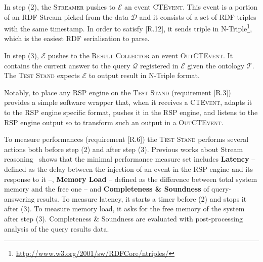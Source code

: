                                                                                                                                                                                                                                                                                                                                                                                                                                                                                                                                                                                                                                                                                                                                                                                                                                                                                                                                                                                                                                                                                                                                                                                                                                              

In step (2), the \textsc{Streamer} pushes to $\mathcal{E}$ an event \textsc{CTEvent}. This event is a portion of an RDF Stream picked from the data $\mathcal{D}$ and it consists of a set of RDF triples with the same timestamp. In order to satisfy [R.12], it sends triple in N-Triple\footnote{\url{http://www.w3.org/2001/sw/RDFCore/ntriples/}}, which is the easiest RDF serialisation to parse.  


In step (3), $\mathcal{E}$ pushes to the \textsc{Result Collector} an event \textsc{OutCTEvent}. It contains the current answer to the query $\mathcal{Q}$ registered in $\mathcal{E}$ given the ontology $\mathcal{T}$. The \textsc{Test Stand} expects $\mathcal{E}$ to output result in N-Triple format. 

Notably, to place any RSP engine on the \textsc{Test Stand} (requirement [R.3]) \name provides a simple software wrapper that, when it receives a \textsc{CTEvent}, adapts it to the RSP engine specific format, pushes it in the RSP engine, and listens to the RSP engine output so to transform such an output in a \textsc{OutCTEvent}.

To measure performances (requirement [R.6]) the \textsc{Test Stand} performs several actions both before step (2) and after step (3). Previous works about Stream reasoning~\cite{DBLP:conf/esws/ScharrenbachUMVB13} shows that the minimal performance measure set includes \textbf{Latency} -- defined as the delay between the injection of an event in the RSP engine and its response to it --, \textbf{Memory Load} -- defined as the difference between total system memory and the free one -- and \textbf{Completeness \& Soundness} of query-answering results. To measure latency, it starts a timer before (2) and stops it after (3). To measure memory load, it asks for the free memory of the system after step (3). Completeness \& Soundness are evaluated with post-processing analysis of the query results data.

